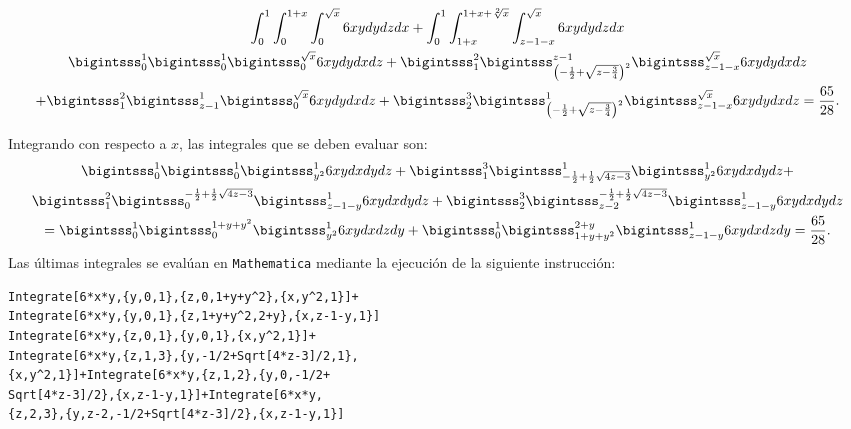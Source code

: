 \clearpage

\vspace*{-1.8\baselineskip}

\begingroup
\setlength{\abovedisplayskip}{0pt}
\setlength{\abovedisplayshortskip}{0pt}
\begin{gather*} \int_{0}^{1}\int_{0}^{1+x}\int_{0}^{\sqrt{x}}6xydydzdx+\int_{0}^{1}\int_{1+x}^{1+x+\sqrt[2]{x}}\int_{z-1-x}^{\sqrt{x}}6xydydzdx \\
\bigintsss_{0}^{1}\bigintsss_{0}^{1}\bigintsss_{0}^{\sqrt{x}}6xydydxdz
+\bigintsss_{1}^2\bigintsss_{\left( -\frac{1}{2}+\sqrt{z-\frac{3}{4}}\right) ^2}^{z-1}\bigintsss_{z-1-x}^{\sqrt{x}}6xydydxdz\\
+\bigintsss_{1}^2\bigintsss_{z-1}^{1}\bigintsss_{0}^{\sqrt{x}}6xydydxdz +\bigintsss_{2}^{3}\bigintsss_{\left( -\frac{1}{2}+\sqrt{z-\frac{3}{4}}\right)
^2}^{1}\bigintsss_{z-1-x}^{\sqrt{x}}6xydydxdz= \frac{65}{28}.
\end{gather*}
\endgroup

Integrando con respecto a $x$, las integrales que se deben evaluar son:
\begin{gather*}
\bigintsss_{0}^{1}\bigintsss_{0}^{1}\bigintsss_{y^2}^{1}6xydxdydz+\bigintsss_{1}^{3}\bigintsss_{-\frac{1}{2}+\frac{1}{2}\sqrt{4z-3}}^{1}\bigintsss_{y^2}^{1}6xydxdydz+ \\ \bigintsss_{1}^{2}\bigintsss_{0}^{-\frac{1}{2}+\frac{1}{2}\sqrt{4z-3}}\bigintsss_{z-1-y}^{1}6xydxdydz+\bigintsss_{2}^{3}\bigintsss_{z-2}^{-\frac{1}{2}+\frac{1}{2}\sqrt{4z-3}}\bigintsss_{z-1-y}^{1}6xydxdydz \\
=\bigintsss_{0}^{1}\bigintsss_{0}^{1+y+y^2}\bigintsss_{y^2}^{1}6xydxdzdy+\bigintsss_{0}^{1}\bigintsss_{1+y+y^2}^{2+y}\bigintsss_{z-1-y}^{1}6xydxdzdy= \frac{65}{28}.
\end{gather*}
Las últimas integrales se evalúan en \verb"Mathematica" mediante la ejecución de la siguiente instrucción:

\begin{tcolorbox}[title=\bf Instrucción en \verb"Mathematica"]\begin{Verbatim}[formatcom=\letraverbatim]
Integrate[6*x*y,{y,0,1},{z,0,1+y+y^2},{x,y^2,1}]+
Integrate[6*x*y,{y,0,1},{z,1+y+y^2,2+y},{x,z-1-y,1}]
Integrate[6*x*y,{z,0,1},{y,0,1},{x,y^2,1}]+
Integrate[6*x*y,{z,1,3},{y,-1/2+Sqrt[4*z-3]/2,1},
{x,y^2,1}]+Integrate[6*x*y,{z,1,2},{y,0,-1/2+
Sqrt[4*z-3]/2},{x,z-1-y,1}]+Integrate[6*x*y,
{z,2,3},{y,z-2,-1/2+Sqrt[4*z-3]/2},{x,z-1-y,1}]
\end{Verbatim}
\end{tcolorbox}

